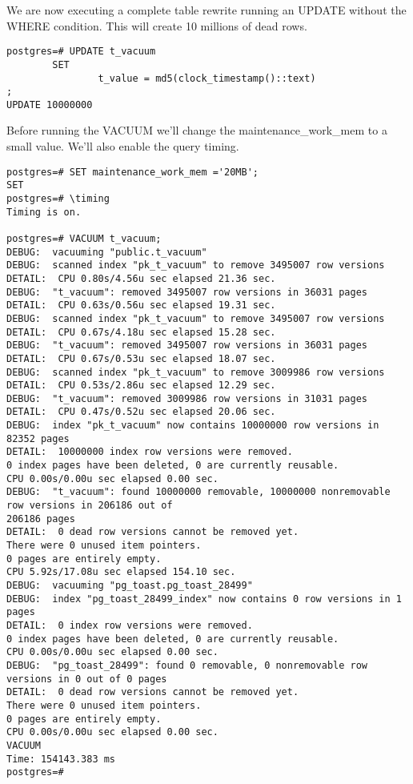 We are now executing a complete table rewrite running an UPDATE without the WHERE condition. 
This will create 10 millions of dead rows.\newline

\begin{lstlisting}[style=pgsql]
postgres=# UPDATE t_vacuum 
        SET 
                t_value = md5(clock_timestamp()::text)
;
UPDATE 10000000

\end{lstlisting}

Before running the VACUUM we'll change the maintenance\_work\_mem to a small value. We'll also enable the 
query timing.\newline

\begin{lstlisting}[style=pgsql]
postgres=# SET maintenance_work_mem ='20MB';
SET
postgres=# \timing
Timing is on.

postgres=# VACUUM t_vacuum;
DEBUG:  vacuuming "public.t_vacuum"
DEBUG:  scanned index "pk_t_vacuum" to remove 3495007 row versions
DETAIL:  CPU 0.80s/4.56u sec elapsed 21.36 sec.
DEBUG:  "t_vacuum": removed 3495007 row versions in 36031 pages
DETAIL:  CPU 0.63s/0.56u sec elapsed 19.31 sec.
DEBUG:  scanned index "pk_t_vacuum" to remove 3495007 row versions
DETAIL:  CPU 0.67s/4.18u sec elapsed 15.28 sec.
DEBUG:  "t_vacuum": removed 3495007 row versions in 36031 pages
DETAIL:  CPU 0.67s/0.53u sec elapsed 18.07 sec.
DEBUG:  scanned index "pk_t_vacuum" to remove 3009986 row versions
DETAIL:  CPU 0.53s/2.86u sec elapsed 12.29 sec.
DEBUG:  "t_vacuum": removed 3009986 row versions in 31031 pages
DETAIL:  CPU 0.47s/0.52u sec elapsed 20.06 sec.
DEBUG:  index "pk_t_vacuum" now contains 10000000 row versions in 82352 pages
DETAIL:  10000000 index row versions were removed.
0 index pages have been deleted, 0 are currently reusable.
CPU 0.00s/0.00u sec elapsed 0.00 sec.
DEBUG:  "t_vacuum": found 10000000 removable, 10000000 nonremovable row versions in 206186 out of 
206186 pages
DETAIL:  0 dead row versions cannot be removed yet.
There were 0 unused item pointers.
0 pages are entirely empty.
CPU 5.92s/17.08u sec elapsed 154.10 sec.
DEBUG:  vacuuming "pg_toast.pg_toast_28499"
DEBUG:  index "pg_toast_28499_index" now contains 0 row versions in 1 pages
DETAIL:  0 index row versions were removed.
0 index pages have been deleted, 0 are currently reusable.
CPU 0.00s/0.00u sec elapsed 0.00 sec.
DEBUG:  "pg_toast_28499": found 0 removable, 0 nonremovable row versions in 0 out of 0 pages
DETAIL:  0 dead row versions cannot be removed yet.
There were 0 unused item pointers.
0 pages are entirely empty.
CPU 0.00s/0.00u sec elapsed 0.00 sec.
VACUUM
Time: 154143.383 ms
postgres=# 


\end{lstlisting}

